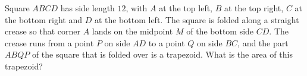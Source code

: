 Square $ABCD$ has side length $12$, with $A$ at the top left, $B$ at the top right, $C$ at the bottom right and $D$ at the bottom left. The square is folded along a straight crease so that corner $A$ lands on the midpoint $M$ of the bottom side $CD$. The crease runs from a point $P$ on side $AD$ to a point $Q$ on side $BC$, and the part $ABQP$ of the square that is folded over is a trapezoid. What is the area of this trapezoid?

